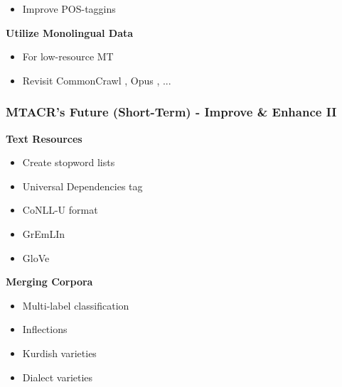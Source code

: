 \documentclass[aspectratio=169]{beamer}
\begin{document}
\begin{frame}[fragile]
\begin{minipage}{.50\textwidth}
\begin{itemize}
        \item Improve POS-taggins \citep{morad2024PartofSpeechTaggingNorthern}
    \end{itemize}
    \textbf{Utilize Monolingual Data}
    \begin{itemize}
        \item For low-resource MT \citep{karakanta2018NeuralMachineTranslation} %
        \item Revisit CommonCrawl \citep{kargaran2024GlotCCOpenBroadCoverage}, Opus \citep{tiedemann2012ParallelDataTools}, ... 
    \end{itemize}
    \end{minipage}
\end{frame}

\begin{frame}[fragile]
	\frametitle{MTACR's Future (Short-Term) - Improve \& Enhance II}
    \begin{minipage}{.50\textwidth}
    \footnotesize
    \textbf{Text Resources}
    \begin{itemize}
        \item Create stopword lists
        \item Universal Dependencies tag \citep{demarneffe2021UniversalDependencies}
        \item CoNLL-U format \citep{buchholz2006CoNLLXSharedTask}
        \item GrEmLIn \citep{gurgurov2025GrEmLInRepositoryGreen} %
        \item GloVe \citep{pennington2014GloVeGlobalVectors}
    \end{itemize}
    \textbf{Merging Corpora}
    \begin{itemize}
        \item Multi-label classification \citep{bernier-colborne2023DialectVariantIdentification, marchal2022EstablishingAnnotationQuality, fornaciari2021BlackWhiteLeveraging, plank2022ProblemHumanLabel}
        \item Inflections \citep{metheniti2020WikinflectionCorpusBetter} %
        \item Kurdish varieties \citep{ahmadi2023ApproachesCorpusCreation, ahmadi2022LeveragingMultilingualNews}
        \item Dialect varieties \citep{alam2023CODETBenchmarkContrastive}
    \end{itemize}
    \end{minipage}%
    \begin{minipage}{.50\textwidth}

\end{minipage}
\end{frame}
\end{document}
